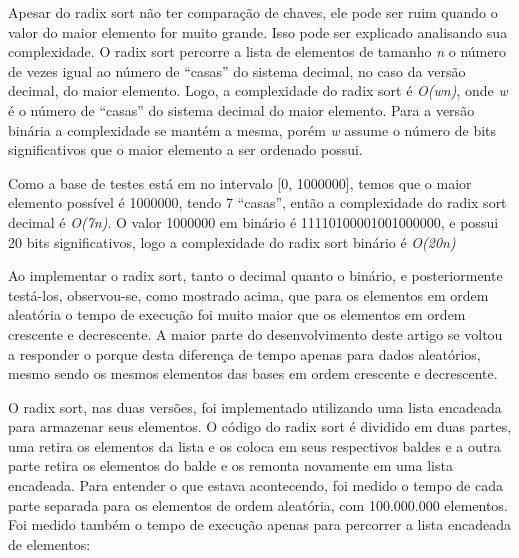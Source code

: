 \documentclass[fleqn,10pt]{SelfArx} %
\begin{document}
{\setlength{\parindent}{-0.5em}
}\newline

Apesar do radix sort não ter comparação de chaves, ele pode ser ruim quando o valor do maior elemento for muito grande.
Isso pode ser explicado analisando sua complexidade. O radix sort percorre a lista de elementos de tamanho \emph{n} o 
número de vezes igual ao número de ``casas'' do sistema decimal, no caso da versão decimal, do maior elemento. 
Logo, a complexidade do radix sort é \emph{O(wn)}, onde \emph{w} é o número de ``casas'' do sistema decimal do maior 
elemento. Para a versão binária a complexidade se mantém a mesma, porém \emph{w} assume o número de bits 
significativos que o maior elemento a ser ordenado possui.

Como a base de testes está em no intervalo [0, 1000000], temos que o maior elemento possível é 1000000, 
tendo 7 ``casas'', então a complexidade do radix sort decimal é \emph{O(7n)}. O valor 1000000 em binário é 
11110100001001000000, e possui 20 bits significativos, logo a complexidade do radix sort binário é \emph{O(20n)}

Ao implementar o radix sort, tanto o decimal quanto o binário, e posteriormente testá-los, observou-se, como 
mostrado acima, que para os elementos em ordem aleatória o tempo de execução foi muito maior que os elementos em 
ordem crescente e decrescente. A maior parte do desenvolvimento deste artigo se voltou a responder o porque desta 
diferença de tempo apenas para dados aleatórios, mesmo sendo os mesmos elementos das bases em ordem crescente e 
decrescente.

O radix sort, nas duas versões, foi implementado utilizando uma lista encadeada para armazenar seus elementos.
O código do radix sort é dividido em duas partes, uma retira os elementos da lista e os coloca em seus 
respectivos baldes e a outra parte retira os elementos do balde e os remonta novamente em uma lista encadeada. 
Para entender o que estava acontecendo, 
foi medido o tempo de cada parte separada para os elementos de ordem aleatória, com 100.000.000 elementos. Foi medido 
também o tempo de execução apenas para percorrer a lista encadeada de elementos:\newline
\end{document}
